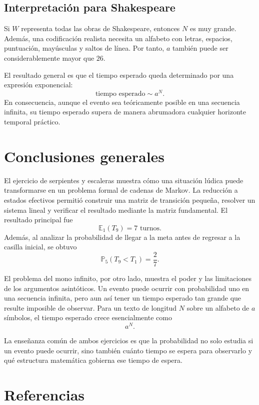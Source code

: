 \documentclass[12pt,a4paper]{article}
\newcommand{\E}{\mathbb{E}}
\newcommand{\Prob}{\mathbb{P}}
\theoremstyle{definition}
\begin{document}
\subsection{Interpretación para Shakespeare}

Si \(W\) representa todas las obras de Shakespeare, entonces \(N\) es muy grande. Además, una codificación realista necesita un alfabeto con letras, espacios, puntuación, mayúsculas y saltos de línea. Por tanto, \(a\) también puede ser considerablemente mayor que \(26\).

El resultado general es que el tiempo esperado queda determinado por una expresión exponencial:
\[
    \boxed{\text{tiempo esperado}\sim a^N.}
\]
En consecuencia, aunque el evento sea teóricamente posible en una secuencia infinita, su tiempo esperado supera de manera abrumadora cualquier horizonte temporal práctico.

\section{Conclusiones generales}

El ejercicio de serpientes y escaleras muestra cómo una situación lúdica puede transformarse en un problema formal de cadenas de Markov. La reducción a estados efectivos permitió construir una matriz de transición pequeña, resolver un sistema lineal y verificar el resultado mediante la matriz fundamental. El resultado principal fue
\[
    \boxed{\E_1(T_9)=7\text{ turnos}.}
\]
Además, al analizar la probabilidad de llegar a la meta antes de regresar a la casilla inicial, se obtuvo
\[
    \boxed{\Prob_5(T_9<T_1)=\frac27.}
\]

El problema del mono infinito, por otro lado, muestra el poder y las limitaciones de los argumentos asintóticos. Un evento puede ocurrir con probabilidad uno en una secuencia infinita, pero aun así tener un tiempo esperado tan grande que resulte imposible de observar. Para un texto de longitud \(N\) sobre un alfabeto de \(a\) símbolos, el tiempo esperado crece esencialmente como
\[
    \boxed{a^N}.
\]

La enseñanza común de ambos ejercicios es que la probabilidad no solo estudia si un evento puede ocurrir, sino también cuánto tiempo se espera para observarlo y qué estructura matemática gobierna ese tiempo de espera.

\section*{Referencias}
\end{document}
